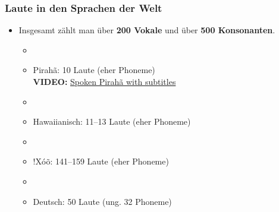 \begin{frame}
\frametitle{Laute in den Sprachen der Welt}

	\begin{itemize}
		\item Insgesamt zählt man über \textbf{200 Vokale} und über \textbf{500 Konsonanten}.
		
		\begin{itemize}
			\item[]
			\item Pirahã: 10 Laute (eher Phoneme)\\
			\textbf{VIDEO:} \href{run:material/04SpokenPiraha.mp4}{Spoken Pirahã with subtitles}
			\item[]
			\item Hawaiianisch: 11--13 Laute (eher Phoneme)
			\item[]
			\item {!}Xóõ: 141--159 Laute (eher Phoneme)
			\item[]
			\item Deutsch: 50 Laute (ung. 32 Phoneme)
		\end{itemize}
		
	\end{itemize}
	
\end{frame}




